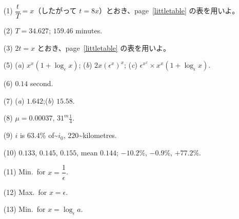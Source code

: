 \documentclass[a4paper,11pt,openany]{ltjsbook}
\newcommand{\Pageref}[2][p.]{#1~\ref{#2}}
\begin{document}
\begin{enumerate}
\item[(1)]  $\dfrac{t}{T} = x$（したがって $t = 8x$）とおき、\Pageref[page]{littletable} の表を用いよ。

\item[(2)]  $T = 34.627$; $159.46$ minutes.

\item[(3)]  $2t = x$ とおき、\Pageref[page]{littletable} の表を用いよ。

\item[(5)]  (\textit{a}) $x^x (1 + \log_\epsilon x)$;\quad
(\textit{b}) $2x (\epsilon^x)^x$;\quad
(\textit{c}) $\epsilon^{x^x} \times  x^x (1 + \log_\epsilon x)$.

\item[(6)]  $0.14$ second.

\item[(7)]  (\textit{a}) $1.642$;\quad (\textit{b}) $15.58$.

\item[(8)]  $\mu = 0.00037$, $31^m \frac{1}{4}$. %

\item[(9)]  $i$ is $63.4$\% of\textasciitilde{}$i_0$, $220$\textasciitilde{}kilometres.

\item[(10)]  $0.133$, $0.145$, $0.155$, mean $0.144$; $-10.2$\%, $-0.9$\%, $+77.2$\%.

\item[(11)]  Min.\ for $x = \dfrac{1}{\epsilon}$.

\item[(12)]  Max.\ for $x = \epsilon$.

\item[(13)]  Min.\ for $x = \log_\epsilon a$.
\par\smallskip

\end{enumerate}
\par\bigskip{}\par\smallskip
\end{document}
